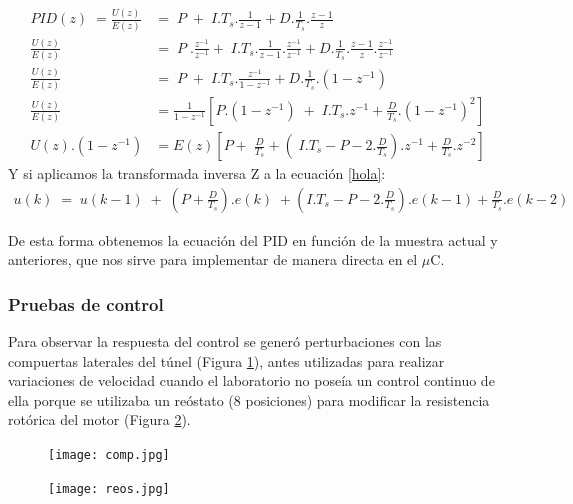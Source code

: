      \begin{align}
    PID(z)\;=\frac{U(z)}{E(z)}&=\;P\;+\;I.T_s.\frac1{z-1}+D.\frac1{T_s}.\frac{z-1}z \label{PIDZ}\\
    \frac{U(z)}{E(z)}&=\;P\;.\frac{z^{-1}}{z^{-1}}+\;I.T_s.\frac1{z-1}.\frac{z^{-1}}{z^{-1}}+D.\frac1{T_s}.\frac{z-1}z.\frac{z^{-1}}{z^{-1}}\;\\
    \frac{U(z)}{E(z)}&=\;P\;+\;I.T_s.\frac{z^{-1}}{1-z^{-1}}+D.\frac1{T_s}.(1-z^{-1})\\
    \frac{U(z)}{E(z)}&=\frac1{1-z^{-1}}\left[P.\left(1-z^{-1}\right)\;+\;I.T_s.z^{-1}+\frac D{T_s}.(1-z^{-1})^2\right]\;\\
    U(z).\left(1-z^{-1}\right)&=E(z)\left[P+\;\frac D{T_s}+\left(\;I.T_s-P-2.\frac D{T_s}\right).z^{-1}+\frac D{T_s}.z^{-2}\right]\;\label{hola}
    \end{align}
Y si aplicamos la transformada inversa Z a la ecuación \ref{hola}:
\begin{align}
	u(k)\;=\;u(k-1)\;+\;\left(P+\frac D{T_s}\right).e(k)\;+\left(I.T_s-P-2.\frac D{T_s}\right).e(k-1)+\frac D{T_s}.e(k-2)\label{ecdiscreta}
\end{align}

De esta forma obtenemos la ecuación del PID en función de la muestra actual y anteriores, que nos sirve para implementar de manera directa en el $\mu$C. 

\subsubsection{Pruebas de control}
Para observar la respuesta del control se generó perturbaciones con las compuertas laterales del túnel (Figura \ref{fig:comp}), antes utilizadas para realizar variaciones de velocidad \cite{barila1993desarrollo} cuando el laboratorio no poseía un control continuo de ella porque se utilizaba un reóstato (8 posiciones) para modificar la resistencia rotórica del motor (Figura \ref{fig:reos}). 

\begin{figure}[H]
	\centering
	\texttt{[image: comp.jpg]}
	\label{fig:comp}
\end{figure}

\begin{figure}[H]
	\centering
	\texttt{[image: reos.jpg]}
	\label{fig:reos}
\end{figure}

